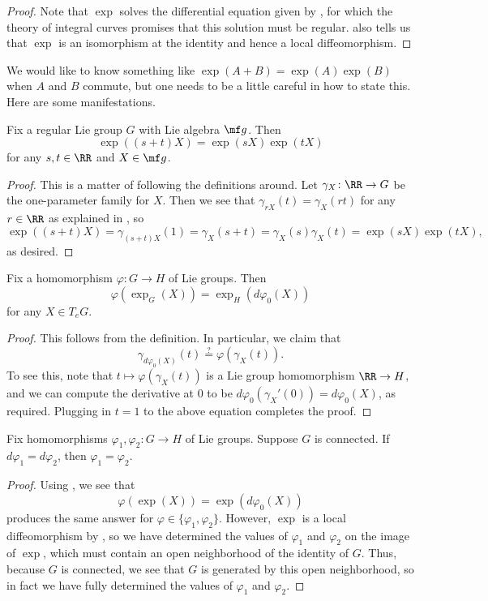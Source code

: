 \documentclass[../notes.tex]{subfiles}
\begin{document}
\begin{proof}
	Note that $\exp$ solves the differential equation given by , for which the theory of integral curves promises that this solution must be regular.  also tells us that $\exp$ is an isomorphism at the identity and hence a local diffeomorphism.
\end{proof}
We would like to know something like $\exp(A+B)=\exp(A)\exp(B)$ when $A$ and $B$ commute, but one needs to be a little careful in how to state this. Here are some manifestations.
\begin{proposition}
	Fix a regular Lie group $G$ with Lie algebra $\mf g$. Then
	\[\exp((s+t)X)=\exp(sX)\exp(tX)\]
	for any $s,t\in\RR$ and $X\in\mf g$.
\end{proposition}
\begin{proof}
	This is a matter of following the definitions around. Let $\gamma_X\colon\RR\to G$ be the one-parameter family for $X$. Then we see that $\gamma_{rX}(t)=\gamma_X(rt)$ for any $r\in\RR$ as explained in , so
	\[\exp((s+t)X)=\gamma_{(s+t)X}(1)=\gamma_X(s+t)=\gamma_X(s)\gamma_X(t)=\exp(sX)\exp(tX),\]
	as desired.
\end{proof}
\begin{proposition} \label{lem:exp-on-homs}
	Fix a homomorphism $\varphi\colon G\to H$ of Lie groups. Then
	\[\varphi(\exp_G(X))=\exp_H(d\varphi_0(X))\]
	for any $X\in T_eG$.
\end{proposition}
\begin{proof}
	This follows from the definition. In particular, we claim that
	\[\gamma_{d\varphi_0(X)}(t)\stackrel?=\varphi(\gamma_X(t)).\]
	To see this, note that $t\mapsto\varphi(\gamma_X(t))$ is a Lie group homomorphism $\RR\to H$, and we can compute the derivative at $0$ to be $d\varphi_0(\gamma_X'(0))=d\varphi_0(X)$, as required. Plugging in $t=1$ to the above equation completes the proof.
\end{proof}
\begin{corollary} \label{cor:get-morphism-from-algebra}
	Fix homomorphisms $\varphi_1,\varphi_2\colon G\to H$ of Lie groups. Suppose $G$ is connected. If $d\varphi_1=d\varphi_2$, then $\varphi_1=\varphi_2$.
\end{corollary}
\begin{proof}
	Using , we see that
	\[\varphi(\exp(X))=\exp(d\varphi_0(X))\]
	produces the same answer for $\varphi\in\{\varphi_1,\varphi_2\}$. However, $\exp$ is a local diffeomorphism by , so we have determined the values of $\varphi_1$ and $\varphi_2$ on the image of $\exp$, which must contain an open neighborhood of the identity of $G$. Thus, because $G$ is connected, we see that $G$ is generated by this open neighborhood, so in fact we have fully determined the values of $\varphi_1$ and $\varphi_2$.
\end{proof}
\end{document}
